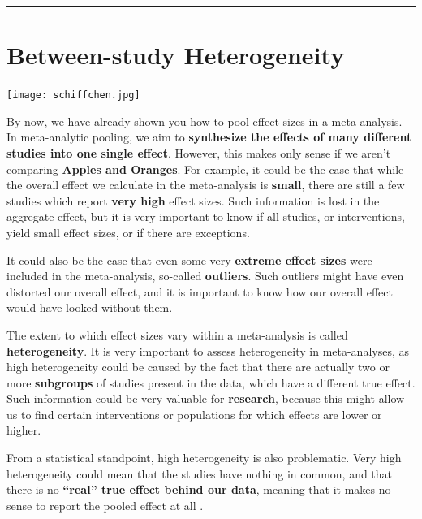 \documentclass[]{book}
\begin{document}
\begin{center}\rule{0.5\linewidth}{\linethickness}\end{center}

\hypertarget{heterogeneity}{%
\chapter{Between-study Heterogeneity}\label{heterogeneity}}

\texttt{[image: schiffchen.jpg]}

By now, we have already shown you how to pool effect sizes in a meta-analysis. In meta-analytic pooling, we aim to \textbf{synthesize the effects of many different studies into one single effect}. However, this makes only sense if we aren't comparing \textbf{Apples and Oranges}. For example, it could be the case that while the overall effect we calculate in the meta-analysis is \textbf{small}, there are still a few studies which report \textbf{very high} effect sizes. Such information is lost in the aggregate effect, but it is very important to know if all studies, or interventions, yield small effect sizes, or if there are exceptions.

It could also be the case that even some very \textbf{extreme effect sizes} were included in the meta-analysis, so-called \textbf{outliers}. Such outliers might have even distorted our overall effect, and it is important to know how our overall effect would have looked without them.

The extent to which effect sizes vary within a meta-analysis is called \textbf{heterogeneity}. It is very important to assess heterogeneity in meta-analyses, as high heterogeneity could be caused by the fact that there are actually two or more \textbf{subgroups} of studies present in the data, which have a different true effect. Such information could be very valuable for \textbf{research}, because this might allow us to find certain interventions or populations for which effects are lower or higher.

From a statistical standpoint, high heterogeneity is also problematic. Very high heterogeneity could mean that the studies have nothing in common, and that there is no \textbf{``real'' true effect behind our data}, meaning that it makes no sense to report the pooled effect at all \citep{borenstein2011}.
\end{document}
